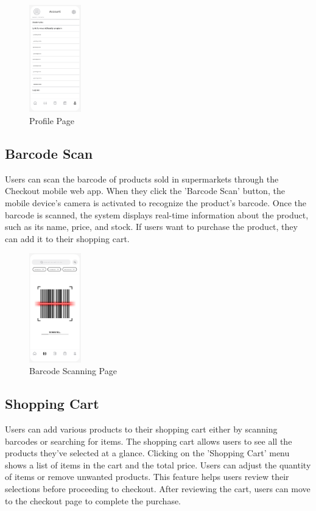 \documentclass[conference]{IEEEtran}
\begin{document}
\begin{figure}[H]  %
    \centering  %
    \includegraphics[width=0.2\textwidth]{account.PNG}  %
    \caption{Profile Page}  %
\end{figure}


\subsection{Barcode Scan}
Users can scan the barcode of products sold in supermarkets through the Checkout mobile web app. When they click the 'Barcode Scan' button, the mobile device's camera is activated to recognize the product’s barcode. Once the barcode is scanned, the system displays real-time information about the product, such as its name, price, and stock. If users want to purchase the product, they can add it to their shopping cart.

\begin{figure}[H]  %
    \centering  %
    \includegraphics[width=0.2\textwidth]{barcode.PNG}  %
    \caption{Barcode Scanning Page}  %
\end{figure}

\subsection{Shopping Cart}
Users can add various products to their shopping cart either by scanning barcodes or searching for items. The shopping cart allows users to see all the products they've selected at a glance. Clicking on the 'Shopping Cart' menu shows a list of items in the cart and the total price. Users can adjust the quantity of items or remove unwanted products. This feature helps users review their selections before proceeding to checkout. After reviewing the cart, users can move to the checkout page to complete the purchase.
\end{document}
